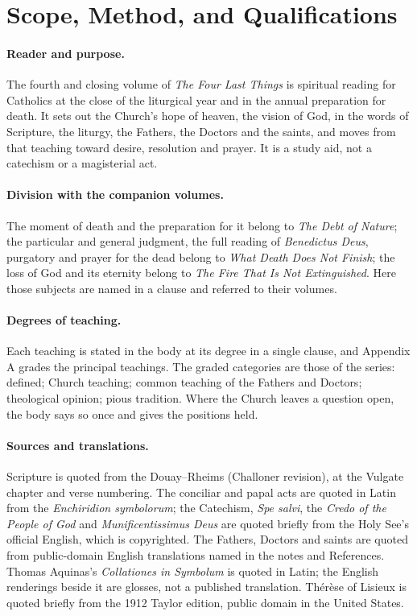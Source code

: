 \section{Scope, Method, and Qualifications}

\paragraph{Reader and purpose.} The fourth and closing volume of \emph{The Four Last Things} is spiritual reading for Catholics at the close of the liturgical year and in the annual preparation for death. It sets out the Church's hope of heaven, the vision of God, in the words of Scripture, the liturgy, the Fathers, the Doctors and the saints, and moves from that teaching toward desire, resolution and prayer. It is a study aid, not a catechism or a magisterial act.

\paragraph{Division with the companion volumes.} The moment of death and the preparation for it belong to \emph{The Debt of Nature}; the particular and general judgment, the full reading of \emph{Benedictus Deus}, purgatory and prayer for the dead belong to \emph{What Death Does Not Finish}; the loss of God and its eternity belong to \emph{The Fire That Is Not Extinguished}. Here those subjects are named in a clause and referred to their volumes.

\paragraph{Degrees of teaching.} Each teaching is stated in the body at its degree in a single clause, and Appendix A grades the principal teachings. The graded categories are those of the series: defined; Church teaching; common teaching of the Fathers and Doctors; theological opinion; pious tradition. Where the Church leaves a question open, the body says so once and gives the positions held.

\paragraph{Sources and translations.} Scripture is quoted from the Douay--Rheims (Challoner revision), at the Vulgate chapter and verse numbering. The conciliar and papal acts are quoted in Latin from the \emph{Enchiridion symbolorum}; the Catechism, \emph{Spe salvi}, the \emph{Credo of the People of God} and \emph{Munificentissimus Deus} are quoted briefly from the Holy See's official English, which is copyrighted. The Fathers, Doctors and saints are quoted from public-domain English translations named in the notes and References. Thomas Aquinas's \emph{Collationes in Symbolum} is quoted in Latin; the English renderings beside it are glosses, not a published translation. Thérèse of Lisieux is quoted briefly from the 1912 Taylor edition, public domain in the United States.

